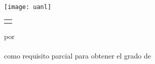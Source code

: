 \thispagestyle{empty}

\begin{scshape}
\begin{center}
	{\Large \uanl} \\[5mm]
	{\large \fcfm} \\[5mm]
	\vskip15mm
	\texttt{[image: uanl]}
	\vskip12mm
	\begin{tabular}{p{11cm}}
		\centering
		{\large \titulo}
	\end{tabular}
	\vskip7mm
	{por}\\[7mm]
	{\large \autor}\\[7mm]
	{como requisito parcial para obtener el grado de}\\[3mm]
	\MakeUppercase{\grado}\\
	\orientacion
	\vfill
	\fecha\\
	\uanl\\
	\fcfm
\end{center}
\end{scshape}



\newpage
\thispagestyle{empty}
\enlargethispage{5mm}

